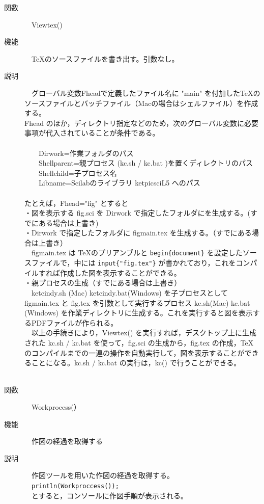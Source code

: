\documentclass[papersize,a4paper,12pt,uplatex]{jsarticle}
\begin{document}
\begin{description}
\hypertarget{viewtex}{}
\item[関数]　Viewtex()
\item[機能]　\TeX のソースファイルを書き出す。引数なし。
\item[説明]　グローバル変数Fheadで定義したファイル名に "main" を付加した\TeX のソースファイルとバッチファイル（Macの場合はシェルファイル）を作成する。\\
Fhead のほか，ディレクトリ指定などのため，次のグローバル変数に必要事項が代入されていることが条件である。\\
　\\
　　Dirwork=作業フォルダのパス\\
　　Shellparent=親プロセス (kc.sh / kc.bat )を置くディレクトリのパス\\
　　Shellchild=子プロセス名\\
　　Libname=Scilabのライブラリ ketpicsciL5 へのパス\\
　\\
たとえば，Fhead="fig" とすると\\
・図を表示する fig.sci を Dirwork で指定したフォルダにを生成する。(すでにある場合は上書き)\\
・Dirwork で指定したフォルダに figmain.tex を生成する。（すでにある場合は上書き）\\
　figmain.tex は \TeX のプリアンブルと \verb|begin{document}| を設定したソースファイルで，中には \verb|input{"fig.tex"}| が書かれており，これをコンパイルすれば作成した図を表示することができる。\\
・親プロセスの生成（すでにある場合は上書き）\\
　ketcindy.sh (Mac) ketcindy.bat(Windows) を子プロセスとして figmain.tex と fig.tex を引数として実行するプロセス kc.sh(Mac) kc.bat (Windows) を作業ディレクトリに生成する。これを実行すると図を表示するPDFファイルが作られる。\\
　以上の手続きにより，Viewtex() を実行すれば，デスクトップ上に生成された kc.sh / kc.bat を使って，fig.sci の生成から，fig.tex の作成，\TeX のコンパイルまでの一連の操作を自動実行して，図を表示することができることになる。kc.sh / kc.bat の実行は，kc() で行うことができる。\\
 \\
 
 \hypertarget{workprocess}{}
\item[関数]　Workprocess(）
\item[機能]　作図の経過を取得する
\item[説明]　作図ツールを用いた作図の経過を取得する。\\
　\verb|println(Workproccess());|\\
　とすると，コンソールに作図手順が表示される。\\

\end{description}
\end{document}

